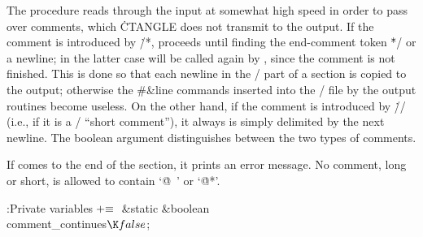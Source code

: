 The  procedure reads through the input at somewhat
high
speed in order to pass over comments, which \.{CTANGLE} does not transmit
to the output. If the comment is introduced by \.{/*}, 
proceeds until finding the end-comment token \.{*/} or a newline; in the
latter case  will be called again by ,
since the
comment is not finished.  This is done so that each newline in the
\CEE/ part of a section is copied to the output; otherwise the \#\&{line}
commands inserted into the \CEE/ file by the output routines become useless.
On the other hand, if the comment is introduced by \.{//} (i.e., if it
is a \CPLUSPLUS/ ``short comment''), it always is simply delimited by the next
newline. The boolean argument  distinguishes between
the two types of comments.

If  comes to the end of the section, it prints an error
message.
No comment, long or short, is allowed to contain `\.{@\ }' or `\.{@*}'.

\Y\B\4:Private variables\X${}\mathrel+\equiv{}$\6
\&{static} \&{boolean} \\{comment\_continues}${}\K\\{false}{}$;\par
\fi

